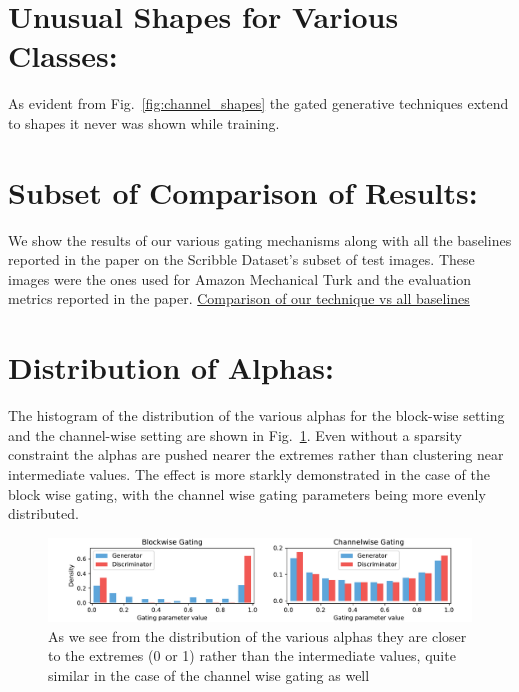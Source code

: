 \documentclass[10pt,twocolumn,letterpaper]{article}
\def\figref#1{Fig.~\ref{#1}}
\begin{document}
\section{Unusual Shapes for Various Classes:}


As evident from \figref{fig:channel_shapes} 
the gated generative techniques extend to shapes it never was shown while training. 

\section{Subset of Comparison of Results:}

We show the results of our various gating mechanisms along with all the baselines reported in the paper on the Scribble Dataset's subset of test images. These images were the ones used for Amazon Mechanical Turk and the evaluation metrics reported in the paper.
\href{http://www.robots.ox.ac.uk/~arnabg/all_results_supplementary/index.html}{Comparison of our technique vs all baselines}

\section{Distribution of Alphas:}
The histogram of the distribution of the various alphas for the block-wise setting and the channel-wise setting are shown in \figref{fig:alpha_hist}. Even without a sparsity constraint the alphas are pushed nearer the extremes rather than clustering near intermediate values. The effect is more starkly demonstrated in the case of the block wise gating, with the channel wise gating parameters being more evenly distributed.
\begin{figure}[t]
    \centering
    \includegraphics[width=\linewidth]{alpha_hist.pdf}
    \caption{As we see from the distribution of the various alphas they are closer to the extremes (0 or 1) rather than the intermediate values, quite similar in the case of the channel wise gating as well }
    \label{fig:alpha_hist}
    \vspace{-3mm}
\end{figure}
\end{document}
